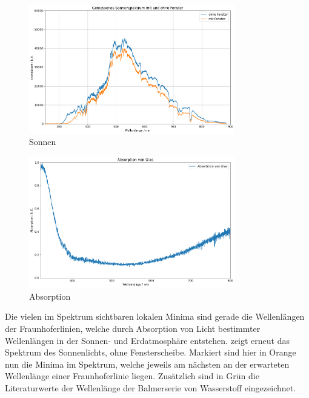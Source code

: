 \begin{figure}[H]
  \centering
  \includegraphics[width=0.8\textwidth]{files/plots/himmel_m_o_g.png}
  \caption{Sonnen}
  \label{fig:himmel_m_o_g}
\end{figure}

\begin{figure}[H]
  \centering
  \includegraphics[width=0.8\textwidth]{files/plots/absorption_glas.png}
  \caption{Absorption}
  \label{fig:absorption_glas}
\end{figure}

Die vielen im Spektrum sichtbaren lokalen Minima sind gerade die Wellenlängen der Fraunhoferlinien, welche durch Absorption von Licht bestimmter Wellenlängen in der Sonnen- und Erdatmosphäre entstehen.  zeigt erneut das Spektrum des Sonnenlichts, ohne Fensterscheibe. Markiert sind hier in Orange nun die Minima im Spektrum, welche jeweils am nächsten an der erwarteten Wellenlänge einer Fraunhoferlinie liegen. Zusätzlich sind in Grün die Literaturwerte der Wellenlänge der Balmerserie von Wasserstoff eingezeichnet.

